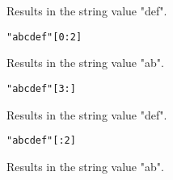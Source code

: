 {\begin{itemize}
{			Results in the string value "def".
		
		\item[] \texttt{"abcdef"[0:2]}
		
			Results in the string value "ab".
			
		\item[] \texttt{"abcdef"[3:]}
		
			Results in the string value "def".
		
		\item[] \texttt{"abcdef"[:2]}
		
			Results in the string value "ab".
	}
	\end{itemize}
}














